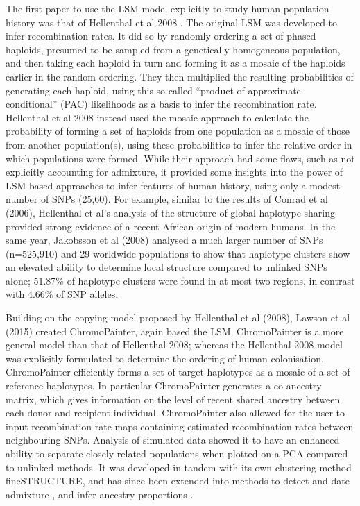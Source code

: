 The first paper to use the LSM model explicitly to study human population history was that of Hellenthal et al 2008 \cite{hellenthal2008inferring}. The original LSM was developed to infer recombination rates. It did so by randomly ordering a set of phased haploids, presumed to be sampled from a genetically homogeneous population, and then taking each haploid in turn and forming it as a mosaic of the haploids earlier in the random ordering. They then multiplied the resulting probabilities of generating each haploid, using this so-called ``product of approximate-conditional'' (PAC) likelihoods as a basis to infer the recombination rate. Hellenthal et al 2008 instead used the mosaic approach to calculate the probability of forming a set of haploids from one population as a mosaic of those from another population(s), using these probabilities to infer the relative order in which populations were formed. While their approach had some flaws, such as not explicitly accounting for admixture, it provided some insights into the power of LSM-based approaches to infer features of human history, using only a modest number of SNPs (25,60). For example, similar to the results of Conrad et al (2006), Hellenthal et al's analysis of the structure of global haplotype sharing provided strong evidence of a recent African origin of modern humans. In the same year, Jakobsson et al (2008) analysed a much larger number of SNPs (n=525,910) and 29 worldwide populations \cite{jakobsson2008genotype} to show that haplotype clusters show an elevated ability to determine local structure compared to unlinked SNPs alone;  51.87\% of haplotype clusters were found in at most two regions, in contrast with 4.66\% of SNP alleles. 

Building on the copying model proposed by Hellenthal et al (2008), Lawson et al (2015) \cite{Lawson2012} created ChromoPainter, again based the LSM. ChromoPainter is a more general model than that of Hellenthal 2008; whereas the Hellenthal 2008 model was explicitly formulated to determine the ordering of human colonisation, ChromoPainter efficiently forms a set of target haplotypes as a mosaic of a set of reference haplotypes. In particular ChromoPainter generates a co-ancestry matrix, which gives information on the level of recent shared ancestry between each donor and recipient individual. ChromoPainter also allowed for the user to input recombination rate maps containing estimated recombination rates between neighbouring SNPs. Analysis of simulated data showed it to have an enhanced ability to separate closely related populations when plotted on a PCA compared to unlinked methods. It was developed in tandem with its own clustering method fineSTRUCTURE, and has since been extended into methods to detect and date admixture \cite{Hellenthal2014}, and infer ancestry proportions \cite{Hellenthal2014,Chacon-Duque2018}. 

